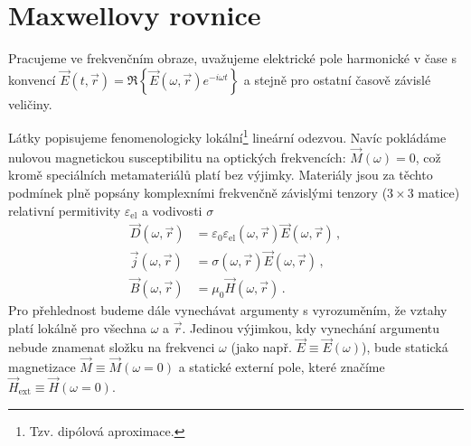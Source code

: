 \section{Maxwellovy rovnice}
\label{chap:maxwellovy-rovnice}

Pracujeme ve frekvenčním obraze, uvažujeme elektrické pole harmonické v čase s konvencí $\vec{E}(t,\vec{r})=\Re\left\lbrace\vec{E}(\omega,\vec{r}) e^{-i\omega t}\right\rbrace$ a stejně pro ostatní časově závislé veličiny.

Látky popisujeme fenomenologicky lokální\footnote{Tzv. dipólová aproximace.} lineární odezvou.
Navíc pokládáme nulovou magnetickou susceptibilitu na optických frekvencích: $\vec{M}(\omega)=0$, což kromě speciálních metamateriálů platí bez výjimky\cite{lindenPhotonicMetamaterialsMagnetism2006}.
Materiály jsou za těchto podmínek plně popsány komplexními frekvenčně závislými tenzory ($3\times 3$ matice) relativní permitivity $\varepsilon_{\textrm{el}}$ a vodivosti $\sigma$
\begin{align}
    \vec{D}(\omega,\vec{r})&=\varepsilon_0 \varepsilon_{\textrm{el}}(\omega,\vec{r})\vec{E}(\omega,\vec{r}) \,, \label{eqn:materialy-D} \\
    \vec{j}(\omega,\vec{r})&=\sigma(\omega,\vec{r})\vec{E}(\omega,\vec{r}) \,, \label{eqn:materialy-J} \\
    \vec{B}(\omega,\vec{r})&=\mu_0 \vec{H}(\omega,\vec{r})  \,. \label{eqn:materialy-B}
\end{align}
Pro přehlednost budeme dále vynechávat argumenty s vyrozuměním, že vztahy platí lokálně pro všechna $\omega$ a $\vec{r}$.
Jedinou výjimkou, kdy vynechání argumentu nebude znamenat složku na frekvenci $\omega$ (jako např. $\vec{E}\equiv\vec{E}(\omega)$), bude statická magnetizace $\vec{M}\equiv\vec{M}(\omega=0)$ a statické externí pole, které značíme $\vec{H}_{\textrm{ext}}\equiv\vec{H}(\omega=0)$.

